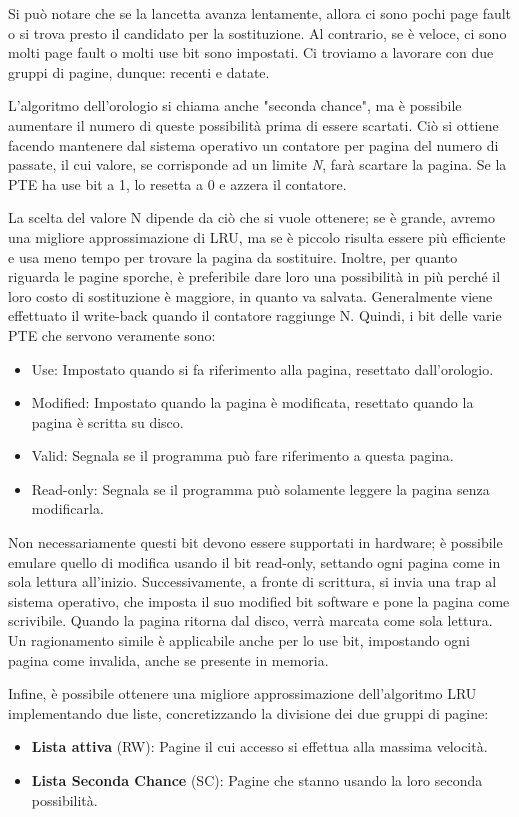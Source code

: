 \noindent Si può notare che se la lancetta avanza lentamente, allora ci sono pochi page fault o si trova presto il candidato per la sostituzione. Al
contrario, se è veloce, ci sono molti page fault o molti use bit sono impostati. Ci troviamo a lavorare con due gruppi di pagine, dunque: recenti e
datate.\par
L'algoritmo dell'orologio si chiama anche "seconda chance", ma è possibile aumentare il numero di queste possibilità prima di essere scartati. Ciò si
ottiene facendo mantenere dal sistema operativo un contatore per pagina del numero di passate, il cui valore, se corrisponde ad un limite \textit{N},
farà scartare la pagina. Se la PTE ha use bit a 1, lo resetta a 0 e azzera il contatore.\par
La scelta del valore N dipende da ciò che si vuole ottenere; se è grande, avremo una migliore approssimazione di LRU, ma se è piccolo risulta essere
più efficiente e usa meno tempo per trovare la pagina da sostituire. Inoltre, per quanto riguarda le pagine sporche, è preferibile dare loro una
possibilità in più perché il loro costo di sostituzione è maggiore, in quanto va salvata. Generalmente viene effettuato il write-back quando il
contatore raggiunge N. Quindi, i bit delle varie PTE che servono veramente sono: \begin{itemize}
    \item Use: Impostato quando si fa riferimento alla pagina, resettato dall'orologio.
    \item Modified: Impostato quando la pagina è modificata, resettato quando la pagina è scritta su disco.
    \item Valid: Segnala se il programma può fare riferimento a questa pagina.
    \item Read-only: Segnala se il programma può solamente leggere la pagina senza modificarla.
\end{itemize}

\noindent Non necessariamente questi bit devono essere supportati in hardware; è possibile emulare quello di modifica usando il bit read-only, settando
ogni pagina come in sola lettura all'inizio. Successivamente, a fronte di scrittura, si invia una trap al sistema operativo, che imposta il suo modified
bit software e pone la pagina come scrivibile. Quando la pagina ritorna dal disco, verrà marcata come sola lettura. Un ragionamento simile è applicabile
anche per lo use bit, impostando ogni pagina come invalida, anche se presente in memoria.\par
Infine, è possibile ottenere una migliore approssimazione dell'algoritmo LRU implementando due liste, concretizzando la divisione dei due gruppi di
pagine: \begin{itemize}
    \item \textbf{Lista attiva} (RW): Pagine il cui accesso si effettua alla massima velocità.
    \item \textbf{Lista Seconda Chance} (SC): Pagine che stanno usando la loro seconda possibilità.
\end{itemize}

